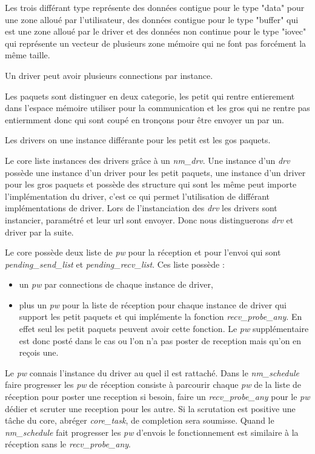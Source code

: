 Les trois différant type représente des données contigue pour le type "data" pour une zone alloué par l'utilisateur,
des données contigue pour le type "buffer" qui est une zone alloué par le driver et
des données non continue pour le type "iovec" qui représente un vecteur de plusieurs zone mémoire qui ne font pas forcément la même taille.

Un driver peut avoir plusieurs connections par instance.

Les paquets sont distinguer en deux categorie,
les petit qui rentre entierement dans l'espace mémoire utiliser pour la communication et
les gros qui ne rentre pas entiermment donc qui sont coupé en tronçons pour être envoyer un par un.

Les drivers on une instance différante pour les petit est les gos paquets.

Le core liste instances des drivers grâce à un \emph{nm_drv}.
Une instance d'un \emph{drv} possède une instance d'un driver pour les petit paquets,
une instance d'un driver pour les gros paquets et
possède des structure qui sont les même peut importe l'implémentation du driver,
c'est ce qui permet l'utilisation de différant implémentations de driver.
Lors de l'instanciation des \emph{drv} les drivers sont instancier, paramétré et leur url sont envoyer.
Donc nous distinguerons \emph{drv} et driver par la suite.

Le core possède deux liste de \emph{pw} pour la réception et pour l'envoi qui sont \emph{pending_send_list} et \emph{pending_recv_list}.
Ces liste possède :
\begin{itemize}
  \item un \emph{pw} par connections de chaque instance de driver,
  \item plus un \emph{pw} pour la liste de réception pour chaque instance de driver qui support les petit paquets et qui implémente la fonction \emph{recv_probe_any}.
  En effet seul les petit paquets peuvent avoir cette fonction.
  Le \emph{pw} supplémentaire est donc posté dans le cas ou l'on n'a pas poster de reception mais qu'on en reçois une.
\end{itemize}

Le \emph{pw} connais l'instance du driver au quel il est rattaché.
Dans le \emph{nm_schedule} faire progresser les \emph{pw} de réception consiste à parcourir chaque \emph{pw} de la liste de réception pour
poster une reception si besoin, faire un \emph{recv_probe_any} pour le \emph{pw} dédier et
scruter une reception pour les autre.
Si la scrutation est positive une tâche du core, abréger \emph{core_task}, de completion sera soumisse.
Quand le \emph{nm_schedule} fait progresser les \emph{pw} d'envois le fonctionnement est similaire à la réception sans le \emph{recv_probe_any}.

